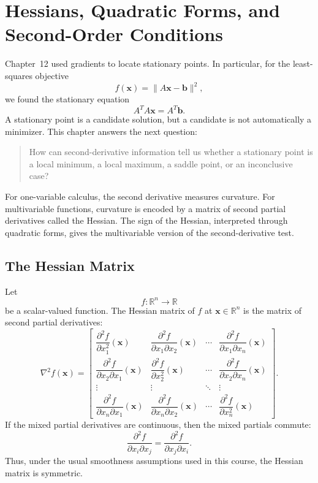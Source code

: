 \chapter{Hessians, Quadratic Forms, and Second-Order Conditions}
\label{mf:ch13-hessians-quadratic-forms-second-order}

Chapter~12 used gradients to locate stationary points. In particular, for the least-squares objective
\[
    f(\mathbf{x})=\|A\mathbf{x}-\mathbf{b}\|^2,
\]
we found the stationary equation
\[
    A^TA\mathbf{x}=A^T\mathbf{b}.
\]
A stationary point is a candidate solution, but a candidate is not automatically a minimizer. This chapter answers the next question:

\begin{quote}
    How can second-derivative information tell us whether a stationary point is a local minimum, a local maximum, a saddle point, or an inconclusive case?
\end{quote}

For one-variable calculus, the second derivative measures curvature. For multivariable functions, curvature is encoded by a matrix of second partial derivatives called the Hessian. The sign of the Hessian, interpreted through quadratic forms, gives the multivariable version of the second-derivative test.

\section{The Hessian Matrix}
\label{mf:hessian}

Let
\[
    f:\mathbb{R}^n\to\mathbb{R}
\]
be a scalar-valued function. The Hessian matrix of \(f\) at \(\mathbf{x}\in\mathbb{R}^n\) is the matrix of second partial derivatives:
\[
    \nabla^2 f(\mathbf{x})
    =
    \begin{bmatrix}
        \dfrac{\partial^2 f}{\partial x_1^2}(\mathbf{x})
        & \dfrac{\partial^2 f}{\partial x_1\partial x_2}(\mathbf{x})
        & \cdots
        & \dfrac{\partial^2 f}{\partial x_1\partial x_n}(\mathbf{x})\\[1.2em]
        \dfrac{\partial^2 f}{\partial x_2\partial x_1}(\mathbf{x})
        & \dfrac{\partial^2 f}{\partial x_2^2}(\mathbf{x})
        & \cdots
        & \dfrac{\partial^2 f}{\partial x_2\partial x_n}(\mathbf{x})\\
        \vdots & \vdots & \ddots & \vdots\\[0.4em]
        \dfrac{\partial^2 f}{\partial x_n\partial x_1}(\mathbf{x})
        & \dfrac{\partial^2 f}{\partial x_n\partial x_2}(\mathbf{x})
        & \cdots
        & \dfrac{\partial^2 f}{\partial x_n^2}(\mathbf{x})
    \end{bmatrix}.
\]
If the mixed partial derivatives are continuous, then the mixed partials commute:
\[
    \frac{\partial^2 f}{\partial x_i\partial x_j}
    =
    \frac{\partial^2 f}{\partial x_j\partial x_i}.
\]
Thus, under the usual smoothness assumptions used in this course, the Hessian matrix is symmetric.

